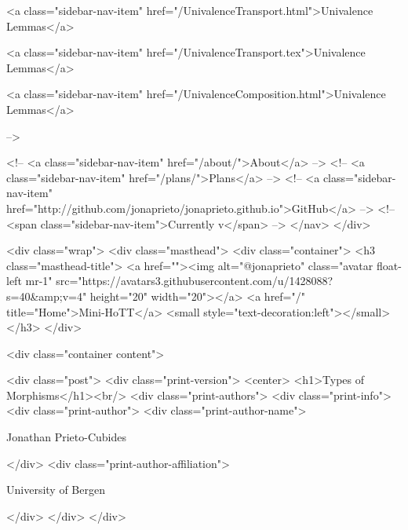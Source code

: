      
    
      
        
          <a class="sidebar-nav-item" href="/UnivalenceTransport.html">Univalence Lemmas</a>
        
      
    
      
        
          <a class="sidebar-nav-item" href="/UnivalenceTransport.tex">Univalence Lemmas</a>
        
      
    
      
        
          <a class="sidebar-nav-item" href="/UnivalenceComposition.html">Univalence Lemmas</a>
        
      
     -->

    <!-- <a class="sidebar-nav-item" href="/about/">About</a> -->
    <!-- <a class="sidebar-nav-item" href="/plans/">Plans</a> -->
    <!-- <a class="sidebar-nav-item" href="http://github.com/jonaprieto/jonaprieto.github.io">GitHub</a> -->
    <!-- <span class="sidebar-nav-item">Currently v</span> -->
  </nav>
</div>

    <div class="wrap">
      <div class="masthead">
        <div class="container">
          <h3 class="masthead-title">
            <a href=""><img alt="@jonaprieto" class="avatar float-left mr-1" src="https://avatars3.githubusercontent.com/u/1428088?s=40&amp;v=4" height="20" width="20"></a>
            <a href="/" title="Home">Mini-HoTT</a>
            <small style="text-decoration:left"></small>
          </h3>
        </div>
      
      <div class="container content">
        







<div class="post">
  <div class="print-version">
    <center>
      <h1>Types of Morphisms</h1><br/>
        <div class="print-authors">
          <div class="print-info">
            <div class="print-author">
              <div class="print-author-name">
                
                  Jonathan Prieto-Cubides
                
              </div>
              <div class="print-author-affiliation">
                
                  University of Bergen
                
                </div>
            </div>
          </div>
          
